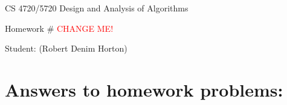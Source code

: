 \documentclass[11pt]{article}
\begin{document}
 

\rhead{\today}

\begin{center}\begin{Large}
CS 4720/5720 Design and Analysis of Algorithms

Homework \#  \textcolor{red}{CHANGE ME!}

Student: (Robert Denim Horton)
\end{Large}
\end{center}

\section*{Answers to homework problems:}

\end{document}
